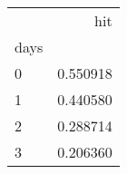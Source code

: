 \begin{tabular}{lr}
\toprule
{} &       hit \\
days &           \\
\midrule
0    &  0.550918 \\
1    &  0.440580 \\
2    &  0.288714 \\
3    &  0.206360 \\
\bottomrule
\end{tabular}
